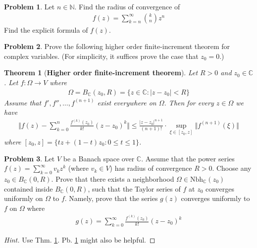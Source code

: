 \documentclass[12pt,b5paper,notitlepage]{article}
\theoremstyle{definition}
\newtheorem{prob}{\color{red}Problem}[section]
\theoremstyle{plain}
\newtheorem{thm}[df]{Theorem}
\newcommand{\Cbb}{\mathbb C}
\newcommand{\Nbb}{\mathbb N}
\newcommand{\Nbh}{\mathrm{Nbh}}
\numberwithin{equation}{section}
\begin{document}
\begin{prob}\label{lb357}
Let $n\in\Nbb$. Find the radius of convergence of
\begin{align}
f(z)=\sum_{k=n}^\infty {k\choose n}z^n
\end{align}
Find the explicit formula of $f(z)$.
\end{prob}



\begin{prob}
Prove the following higher order finite-increment theorem for complex variables. (For simplicity, it suffices prove the case that $z_0=0$.)
\end{prob}

\begin{thm}[\textbf{Higher order finite-increment theorem}]  \label{lb356}
Let $R>0$ and $z_0\in\Cbb$. Let $f:\Omega\rightarrow V$ where
\begin{align*}
\Omega=B_\Cbb(z_0,R)=\{z\in\Cbb:|z-z_0|<R\}
\end{align*}
Assume that $f',f'',\dots,f^{(n+1)}$ exist everywhere on $\Omega$. Then for every $z\in\Omega$ we have
\begin{align}
\Big\Vert f(z)-\sum_{k=0}^n\frac{f^{(k)}(z_0)}{k!}(z-z_0)^k \Big\Vert \leq\frac{|z-z_0|^{n+1}}{(n+1)!}\cdot \sup_{\xi\in[z_0,z]} \Vert f^{(n+1)}(\xi)\Vert
\end{align}
where $[z_0,z]=\{tz+(1-t)z_0:0\leq t\leq 1\}$.
\end{thm}



\begin{prob}
Let $V$ be a Banach space over $\Cbb$. Assume that the power series $f(z)=\sum_{k=0}^\infty v_kz^k$ (where $v_k\in V$) has radius of convergence $R>0$. Choose any $z_0\in B_\Cbb(0,R)$. Prove that there exists a neighborhood $\Omega\in\Nbh_\Cbb(z_0)$ contained inside $B_\Cbb(0,R)$, such that the Taylor series of $f$ at $z_0$ converges uniformly on $\Omega$ to $f$. Namely, prove that the series $g(z)$ converges uniformly to $f$ on $\Omega$ where
\begin{align}
g(z)=\sum_{k=0}^\infty\frac{f^{(k)}(z_0)}{k!}(z-z_0)^k
\end{align}
\end{prob}

\begin{proof}[Hint]
Use Thm. \ref{lb356}.  Pb.  \ref{lb357} might also be helpful.
\end{proof}
\end{document}
